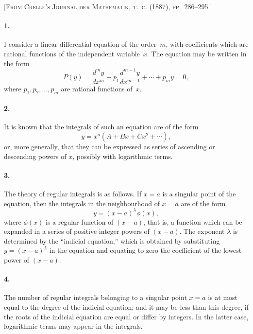 \documentclass[11pt,a4paper]{article}
\theoremstyle{definition}
\begin{document}
\noindent\textsc{[From Crelle's Journal der Mathematik, t.~c. (1887), pp.~286--295.]}

\smallskip

\paragraph{1.} I consider a linear differential equation of the order~$m$, with coefficients which are rational functions of the independent variable~$x$. The equation may be written in the form
\[
P(y) = \frac{d^{m}y}{dx^{m}} + p_{1}\frac{d^{m-1}y}{dx^{m-1}} + \cdots + p_{m}y = 0,
\]
where $p_{1}, p_{2}, \ldots, p_{m}$ are rational functions of~$x$.

\paragraph{2.} It is known that the integrals of such an equation are of the form
\[
y = x^{a}(A + Bx + Cx^{2} + \cdots),
\]
or, more generally, that they can be expressed as series of ascending or descending powers of $x$, possibly with logarithmic terms.

\paragraph{3.} The theory of regular integrals is as follows. If $x = a$ is a singular point of the equation, then the integrals in the neighbourhood of $x = a$ are of the form
\[
y = (x - a)^{\lambda}\phi(x),
\]
where $\phi(x)$ is a regular function of $(x - a)$, that is, a function which can be expanded in a series of positive integer powers of $(x - a)$. The exponent $\lambda$ is determined by the ``indicial equation,'' which is obtained by substituting $y = (x - a)^{\lambda}$ in the equation and equating to zero the coefficient of the lowest power of $(x - a)$.

\paragraph{4.} The number of regular integrals belonging to a singular point $x = a$ is at most equal to the degree of the indicial equation; and it may be less than this degree, if the roots of the indicial equation are equal or differ by integers. In the latter case, logarithmic terms may appear in the integrals.
\end{document}
